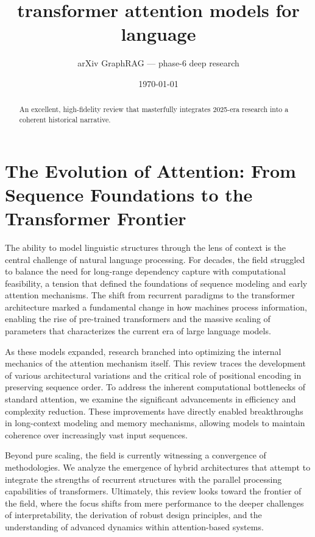 \documentclass[11pt]{article}
\title{transformer attention models for language}
\author{arXiv GraphRAG --- phase-6 deep research}
\date{\today}
\begin{document}
\maketitle

\begin{abstract}
An excellent, high-fidelity review that masterfully integrates 2025-era research into a coherent historical narrative.
\end{abstract}

\section{The Evolution of Attention: From Sequence Foundations to the Transformer Frontier}

The ability to model linguistic structures through the lens of context is the central challenge of natural language processing. For decades, the field struggled to balance the need for long-range dependency capture with computational feasibility, a tension that defined the foundations of sequence modeling and early attention mechanisms. The shift from recurrent paradigms to the transformer architecture marked a fundamental change in how machines process information, enabling the rise of pre-trained transformers and the massive scaling of parameters that characterizes the current era of large language models.

As these models expanded, research branched into optimizing the internal mechanics of the attention mechanism itself. This review traces the development of various architectural variations and the critical role of positional encoding in preserving sequence order. To address the inherent computational bottlenecks of standard attention, we examine the significant advancements in efficiency and complexity reduction. These improvements have directly enabled breakthroughs in long-context modeling and memory mechanisms, allowing models to maintain coherence over increasingly vast input sequences.

Beyond pure scaling, the field is currently witnessing a convergence of methodologies. We analyze the emergence of hybrid architectures that attempt to integrate the strengths of recurrent structures with the parallel processing capabilities of transformers. Ultimately, this review looks toward the frontier of the field, where the focus shifts from mere performance to the deeper challenges of interpretability, the derivation of robust design principles, and the understanding of advanced dynamics within attention-based systems.
\end{document}
